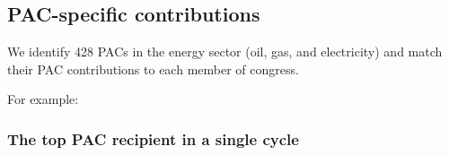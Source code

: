 \documentclass[]{article}
\newenvironment{Shaded}{\begin{snugshade}}{\end{snugshade}}
\newcommand{\KeywordTok}[1]{\textcolor[rgb]{0.13,0.29,0.53}{\textbf{#1}}}
\newcommand{\DataTypeTok}[1]{\textcolor[rgb]{0.13,0.29,0.53}{#1}}
\newcommand{\DecValTok}[1]{\textcolor[rgb]{0.00,0.00,0.81}{#1}}
\newcommand{\StringTok}[1]{\textcolor[rgb]{0.31,0.60,0.02}{#1}}
\newcommand{\OperatorTok}[1]{\textcolor[rgb]{0.81,0.36,0.00}{\textbf{#1}}}
\newcommand{\NormalTok}[1]{#1}
\begin{document}
\subsection{PAC-specific
contributions}\label{pac-specific-contributions}

\begin{Shaded}
\end{Shaded}

We identify 428 PACs in the energy sector (oil, gas, and electricity)
and match their PAC contributions to each member of congress.

For example:

\subsubsection{The top PAC recipient in a single
cycle}\label{the-top-pac-recipient-in-a-single-cycle}
\end{document}
